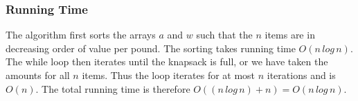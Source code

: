 \documentclass[12pt, oneside]{article}
\begin{document}
\subsubsection*{Running Time}
The algorithm first sorts the arrays $a$ and $w$ such that the $n$ items are in decreasing order of value per pound. The sorting takes running time $O(n\,log\,n)$. The while loop then iterates until the knapsack is full, or we have taken the amounts for all $n$ items. Thus the loop iterates for at most $n$ iterations and is $O(n)$. The total running time is therefore $O((n\,log\,n) + n) = O(n\,log\,n)$. 
\end{document}
